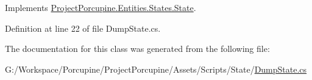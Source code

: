 Implements \hyperlink{class_project_porcupine_1_1_entities_1_1_states_1_1_state_a46337df73c448f5dd84e350e987af8b5}{Project\+Porcupine.\+Entities.\+States.\+State}.



Definition at line 22 of file Dump\+State.\+cs.



The documentation for this class was generated from the following file\+:\begin{DoxyCompactItemize}
\item 
G\+:/\+Workspace/\+Porcupine/\+Project\+Porcupine/\+Assets/\+Scripts/\+State/\hyperlink{_dump_state_8cs}{Dump\+State.\+cs}\end{DoxyCompactItemize}
